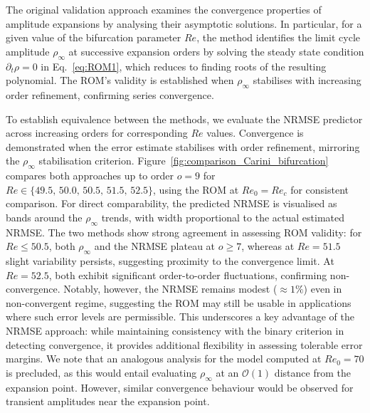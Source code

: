 \documentclass[%
reprint,
superscriptaddress,
 amsmath,amssymb,
 aps,
 pre
]{revtex4-2}
\begin{document}
The original validation approach examines the convergence properties of amplitude expansions by analysing their asymptotic solutions. In particular, for a given value of the bifurcation parameter $Re$, the method identifies the limit cycle amplitude $\rho_{\infty}$ at successive expansion orders by solving the steady state condition $\partial_t \rho = 0$ in Eq.~\eqref{eq:ROM1}, which reduces to finding roots of the resulting polynomial. The ROM's validity is established when $\rho_{\infty}$ stabilises with increasing order refinement, confirming series convergence.

To establish equivalence between the methods, we evaluate the NRMSE predictor across increasing orders for corresponding $Re$ values. Convergence is demonstrated when the error estimate stabilises with order refinement, mirroring the $\rho_{\infty}$ stabilisation criterion.
Figure~\ref{fig:comparison_Carini_bifurcation} compares both approaches up to order $o=9$ for $Re \in \{49.5, \, 50.0, \, 50.5, \, 51.5, \, 52.5 \}$, using the ROM at $Re_0 = Re_{c}$ for consistent comparison. For direct comparability, the predicted NRMSE is visualised as bands around the $\rho_{\infty}$ trends, with width proportional to the actual estimated NRMSE. The two methods show strong agreement in assessing ROM validity: for $Re \leq 50.5$, both $\rho_{\infty}$ and the NRMSE plateau at $o \geq 7$, whereas at $Re = 51.5$ slight variability persists, suggesting proximity to the convergence limit. At $Re=52.5$, both exhibit significant order-to-order fluctuations, confirming non-convergence. Notably, however, the NRMSE remains modest ($\approx 1\%$) even in non-convergent regime, suggesting the ROM may still be usable in applications where such error levels are permissible. This underscores a key advantage of the NRMSE approach: while maintaining consistency with the binary criterion in detecting convergence, it provides additional flexibility in assessing tolerable error margins. We note that an analogous analysis for the model computed at $Re_0 = 70$ is precluded, as this would entail evaluating $\rho_{\infty}$ at an $\mathcal{O}(1)$ distance from the expansion point. However, similar convergence behaviour would be observed for transient amplitudes near the expansion point.
\end{document}
